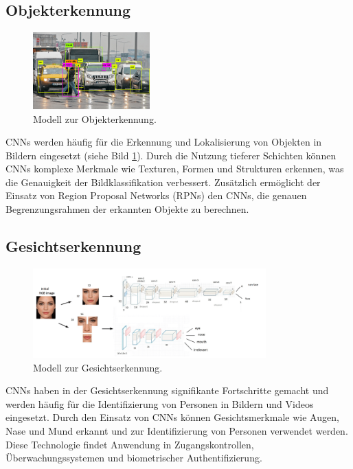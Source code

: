 \subsection{Objekterkennung}

    \begin{figure}[h]
        \centering
        \includegraphics[width=0.4\textwidth]{img/Object-detection-in-a-dense-scene.ppm.png}
        \caption{Modell zur Objekterkennung.}
        \label{fig:modell_finded_etwas}
    \end{figure}

	\acfp{CNN} werden häufig für die Erkennung und Lokalisierung von Objekten in Bildern eingesetzt (siehe Bild \ref{fig:modell_finded_etwas}).
	Durch die Nutzung tieferer Schichten können \acp{CNN} komplexe Merkmale wie Texturen, Formen und Strukturen erkennen, was die Genauigkeit der Bildklassifikation verbessert.
	Zusätzlich ermöglicht der Einsatz von Region Proposal Networks (RPNs) den \acp{CNN}, die genauen Begrenzungsrahmen der erkannten Objekte zu berechnen.

\subsection{Gesichtserkennung}

    \begin{figure}[h]
        \centering
        \includegraphics[width=0.8\textwidth]{img/Top-The-CNN-trained-for-the-task-of-full-face-detection-Bottom-The-CNN-trained-for-the.png}
        \caption{Modell zur Gesichtserkennung.}
        \label{fig:modell_finded_gesicht}
    \end{figure}

	\acfp{CNN} haben in der Gesichtserkennung signifikante Fortschritte gemacht und werden häufig für die Identifizierung von Personen in Bildern und Videos eingesetzt.
	Durch den Einsatz von \acp{CNN} können Gesichtsmerkmale wie Augen, Nase und Mund erkannt und zur Identifizierung von Personen verwendet werden.
	Diese Technologie findet Anwendung in Zugangskontrollen, Überwachungssystemen und biometrischer Authentifizierung.

